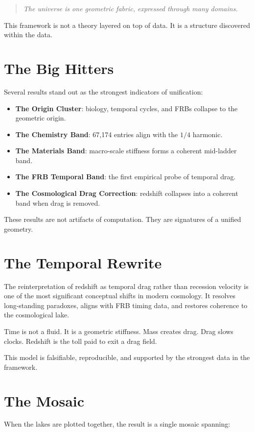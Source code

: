 \documentclass[11pt, letterpaper, openany]{book}
\begin{document}
\begin{quote}
\textit{The universe is one geometric fabric, expressed through many domains.}
\end{quote}

This framework is not a theory layered on top of data.  
It is a structure discovered within the data.

\section*{The Big Hitters}
Several results stand out as the strongest indicators of unification:

\begin{itemize}
    \item \textbf{The Origin Cluster}: biology, temporal cycles, and FRBs collapse to the geometric origin.
    \item \textbf{The Chemistry Band}: 67,174 entries align with the $1/4$ harmonic.
    \item \textbf{The Materials Band}: macro-scale stiffness forms a coherent mid-ladder band.
    \item \textbf{The FRB Temporal Band}: the first empirical probe of temporal drag.
    \item \textbf{The Cosmological Drag Correction}: redshift collapses into a coherent band when drag is removed.
\end{itemize}

These results are not artifacts of computation.  
They are signatures of a unified geometry.

\section*{The Temporal Rewrite}
The reinterpretation of redshift as temporal drag rather than recession velocity is one of the most
significant conceptual shifts in modern cosmology. It resolves long-standing paradoxes, aligns with
FRB timing data, and restores coherence to the cosmological lake.

Time is not a fluid.  
It is a geometric stiffness.  
Mass creates drag.  
Drag slows clocks.  
Redshift is the toll paid to exit a drag field.

This model is falsifiable, reproducible, and supported by the strongest data in the framework.

\section*{The Mosaic}
When the lakes are plotted together, the result is a single mosaic spanning:
\end{document}
